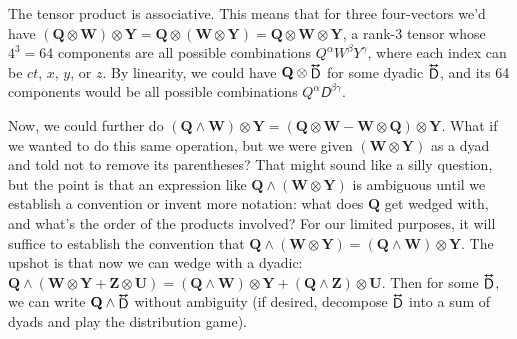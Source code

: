 \documentclass[12pt]{article}
\renewcommand{\vv}[1]{\mathbf{#1}}
\newcommand{\tightoverset}[2]{%
  \mathop{#2}\limits^{\vbox to -.5ex{\kern-0.75ex\hbox{$#1$}\vss}}}
\newcommand{\inlinedy}[1]{\tightoverset{\text{\tiny$\bm\leftrightarrow$}}{#1}}
\begin{document}
The tensor product is associative. This means that for three four-vectors we'd have $(\vv Q \otimes \vv W) \otimes \vv Y = \vv Q \otimes (\vv W \otimes \vv Y) = \vv Q \otimes \vv W \otimes \vv Y$, a rank-3 tensor whose $4^3 = 64$ components are all possible combinations $Q^\alpha W^\beta Y^\gamma$, where each index can be $ct$, $x$, $y$, or $z$. By linearity, we could have $\vv Q \otimes \inlinedy{\mathsf{D}}$ for some dyadic $\inlinedy{\mathsf{D}}$, and its 64 components would be all possible combinations  $Q^\alpha \mathsfit D^{\beta \gamma}$.

Now, we could further do $(\vv Q \wedge \vv W) \otimes \vv Y = (\vv Q \otimes \vv W - \vv W \otimes \vv Q) \otimes \vv Y$. What if we wanted to do this same operation, but we were given $(\vv W \otimes \vv Y)$ as a dyad and told not to remove its parentheses? That might sound like a silly question, but the point is that an expression like $\vv Q \wedge (\vv W \otimes \vv Y)$ is ambiguous until we establish a convention or invent more notation: what does $\vv Q$ get wedged with, and what's the order of the products involved? For our limited purposes, it will suffice to establish the convention that ${\vv Q \wedge (\vv W \otimes \vv Y) = (\vv Q \wedge \vv W) \otimes \vv Y}$. The upshot is that now we can wedge with a dyadic: $\vv Q \wedge (\vv W \otimes \vv Y + \vv Z \otimes \vv U) = (\vv Q \wedge \vv W) \otimes \vv Y + (\vv Q \wedge \vv Z) \otimes \vv U$. Then for some $\inlinedy{\mathsf{D}}$, we can write $\vv Q \wedge \inlinedy{\mathsf{D}}$ without ambiguity (if desired, decompose $\inlinedy{\mathsf{D}}$ into a sum of dyads and play the distribution game).
\end{document}
